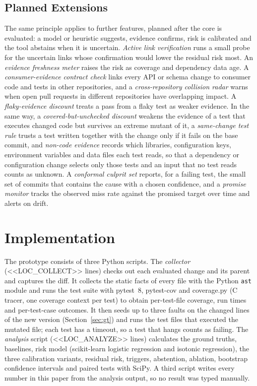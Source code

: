 \documentclass[conference]{IEEEtran}
\begin{document}
\subsection{Planned Extensions}
The same principle applies to further features, planned after the core is evaluated: a model or heuristic suggests, evidence confirms, risk is calibrated and the tool abstains when it is uncertain. \emph{Active link verification} runs a small probe for the uncertain links whose confirmation would lower the residual risk most. An \emph{evidence freshness meter} raises the risk as coverage and dependency data age. A \emph{consumer-evidence contract check} links every API or schema change to consumer code and tests in other repositories, and a \emph{cross-repository collision radar} warns when open pull requests in different repositories have overlapping impact. A \emph{flaky-evidence discount} treats a pass from a flaky test as weaker evidence. In the same way, a \emph{covered-but-unchecked discount} weakens the evidence of a test that executes changed code but survives an extreme mutant of it, a \emph{same-change test rule} trusts a test written together with the change only if it fails on the base commit, and \emph{non-code evidence} records which libraries, configuration keys, environment variables and data files each test reads, so that a dependency or configuration change selects only those tests and an input that no test reads counts as unknown. A \emph{conformal culprit set} reports, for a failing test, the small set of commits that contains the cause with a chosen confidence, and a \emph{promise monitor} tracks the observed miss rate against the promised target over time and alerts on drift.

\section{Implementation}\label{sec:impl}
The prototype consists of three Python scripts. The \emph{collector} (<<LOC_COLLECT>> lines) checks out each evaluated change and its parent and captures the diff. It collects the static facts of every file with the Python \texttt{ast} module and runs the test suite with pytest~8, pytest-cov and coverage.py (C tracer, one coverage context per test) to obtain per-test-file coverage, run times and per-test-case outcomes. It then seeds up to three faults on the changed lines of the new version (Section~\ref{sec:gt}) and runs the test files that executed the mutated file; each test has a timeout, so a test that hangs counts as failing. The \emph{analysis} script (<<LOC_ANALYZE>> lines) calculates the ground truths, baselines, risk model (scikit-learn logistic regression and isotonic regression), the three calibration variants, residual risk, triggers, abstention, ablation, bootstrap confidence intervals and paired tests with SciPy. A third script writes every number in this paper from the analysis output, so no result was typed manually.
\end{document}
